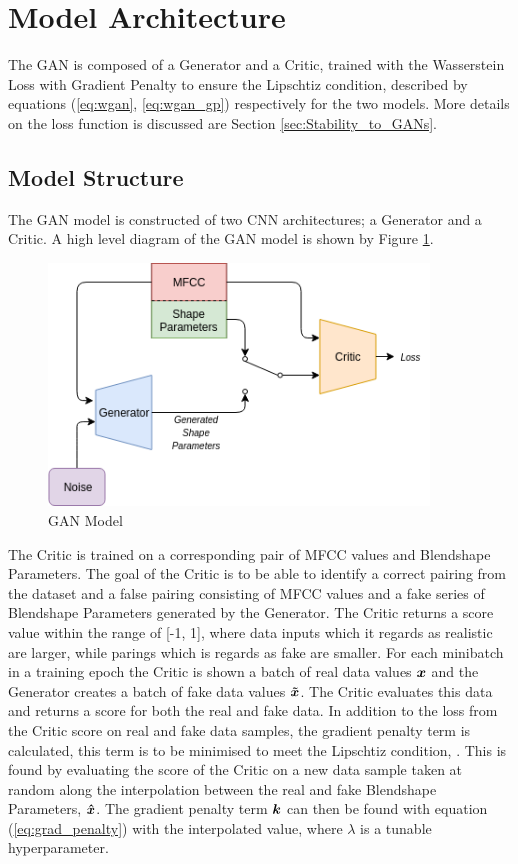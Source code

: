\section{Model Architecture}
The GAN is composed of a Generator and a Critic, trained with the Wasserstein Loss with Gradient Penalty to ensure the Lipschtiz condition, described by equations (\ref{eq:wgan}, \ref{eq:wgan_gp}) respectively for the two models.
More details on the loss function is discussed are Section \ref{sec:Stability_to_GANs}.

\subsection{Model Structure}
The GAN model is constructed of two CNN architectures; a Generator and a Critic.
A high level diagram of the GAN model is shown by Figure \ref{fig:gan_model}.

\begin{figure}[h!]
    \centering
        \includegraphics[width=0.9\textwidth]{figures/gan/gan.png}
    \caption{GAN Model}\label{fig:gan_model}
\end{figure} 

The Critic is trained on a corresponding pair of MFCC values and Blendshape Parameters.
The goal of the Critic is to be able to identify a correct pairing from the dataset and a false pairing consisting of MFCC values and a fake series of Blendshape Parameters generated by the Generator.
The Critic returns a score value within the range of [-1, 1], where data inputs which it regards as realistic are larger, while parings which is regards as fake are smaller.
For each minibatch in a training epoch the Critic is shown a batch of real data values ${\boldsymbol{{x}}}$ and the Generator creates a batch of fake data values ${\boldsymbol{{\tilde{x}}}}$.
The Critic evaluates this data and returns a score for both the real and fake data.
In addition to the loss from the Critic score on real and fake data samples, the gradient penalty term is calculated, this term is to be minimised to meet the Lipschtiz condition, \cite{Gulrajani2017}.
This is found by evaluating the score of the Critic on a new data sample taken at random along the interpolation between the real and fake Blendshape Parameters, ${\boldsymbol{{\hat{x}}}}$.
The gradient penalty term ${\boldsymbol{{k}}}$ can then be found with equation (\ref{eq:grad_penalty}) with the interpolated value, where $\lambda$ is a tunable hyperparameter.

